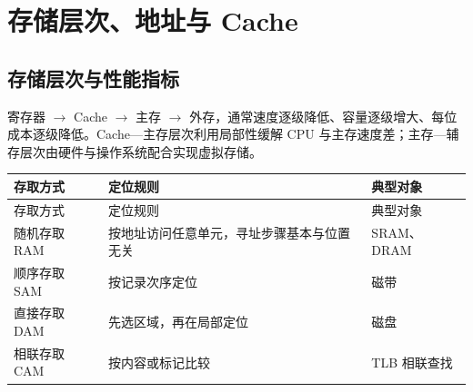 \chapter{存储层次、地址与 Cache}\label{CO03}

\section{存储层次与性能指标}\label{CO03-hierarchy}

寄存器 \ensuremath{\to} Cache \ensuremath{\to} 主存 \ensuremath{\to} 外存，通常速度逐级降低、容量逐级增大、每位成本逐级降低。Cache---主存层次利用局部性缓解 CPU 与主存速度差；主存---辅存层次由硬件与操作系统配合实现虚拟存储。

\par\smallskip
{\fontsize{9.3}{12}\selectfont\setlength{\tabcolsep}{2.5pt}\setlength{\LTleft}{0pt}\setlength{\LTright}{0pt}
\begin{longtable}{@{}>{\raggedright\arraybackslash}p{}>{\raggedright\arraybackslash}p{}>{\raggedright\arraybackslash}p{}@{}}
\toprule
存取方式 & 定位规则 & 典型对象 \\

\midrule\endfirsthead\toprule
存取方式 & 定位规则 & 典型对象 \\

\midrule\endhead\bottomrule\endfoot
随机存取 RAM & 按地址访问任意单元，寻址步骤基本与位置无关 & SRAM、DRAM \\

顺序存取 SAM & 按记录次序定位 & 磁带 \\

直接存取 DAM & 先选区域，再在局部定位 & 磁盘 \\

相联存取 CAM & 按内容或标记比较 & TLB 相联查找 \\

\end{longtable}}
\par\smallskip

